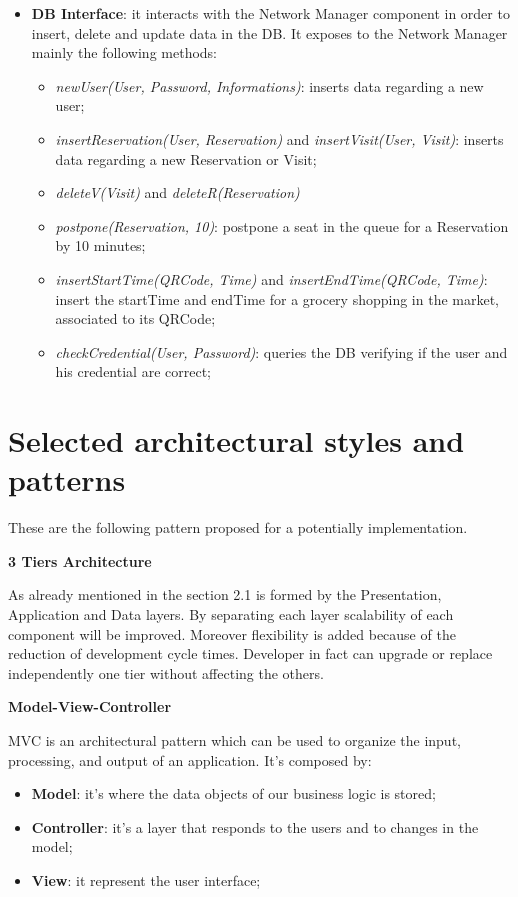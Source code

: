 \begin{itemize}
\item \textbf{DB Interface}: it interacts with the Network Manager component in order to insert, delete and update data in the DB. It exposes to the Network Manager mainly the following methods:
\begin{itemize}
\item \textit{newUser(User, Password, Informations)}: inserts data regarding a new user;
\item \textit{insertReservation(User, Reservation)} and \textit{insertVisit(User, Visit)}: inserts data regarding a new Reservation or Visit;
\item \textit{deleteV(Visit)} and \textit{deleteR(Reservation)}
\item \textit{postpone(Reservation, 10)}: postpone a seat in the queue for a Reservation by 10 minutes;
\item \textit{insertStartTime(QRCode, Time)} and  \textit{insertEndTime(QRCode, Time)}: insert the startTime and endTime for a grocery shopping in the market, associated to its QRCode;
\item \textit{checkCredential(User, Password)}: queries the DB verifying if the user and his credential are correct;
\end{itemize}

\end{itemize}


\section{Selected architectural styles and patterns}
These are the following pattern proposed for a potentially implementation.
\bigskip

\textbf{3 Tiers Architecture} \par
As already mentioned in the section 2.1 is formed by the Presentation, Application and Data layers. By separating each layer scalability of each component will be improved.
Moreover flexibility is added because of the reduction of development cycle times. Developer in fact can upgrade or replace independently one tier without affecting the others. 
\bigskip

\textbf{Model-View-Controller} \par
MVC is an architectural pattern which can be used to organize the input, processing, and output of an application. It's composed by:
\begin{itemize}
\item \textbf{Model}: it's where the data objects of our business logic is stored;
\item \textbf{Controller}: it's a layer that responds to the users and to changes in the model;
\item \textbf{View}: it represent the user interface;
\end{itemize}

